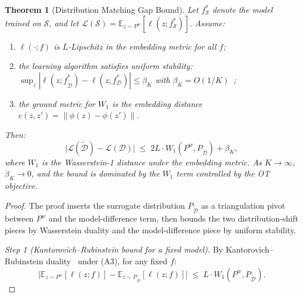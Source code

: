 \documentclass[12pt, a4paper, twoside]{book}
\numberwithin{equation}{chapter}
\theoremstyle{plain}
\newtheorem{theorem}{Theorem}[chapter]
\theoremstyle{definition}
\theoremstyle{remark}
\newenvironment{foldable}{}{}
\begin{document}
\begin{foldable}
  \begin{theorem}[Distribution Matching Gap Bound] \label{thm:gap}
    Let $f^*_{\mathcal{S}}$ denote the model trained on $\mathcal{S}$, and let $\mathcal{L}(\mathcal{S}) = \mathbb{E}_{z \sim P^w}[\ell(z; f^*_{\mathcal{S}})]$.
    Assume:
    \begin{enumerate}[label=\textbf{(A\arabic*)},leftmargin=*]
      \item $\ell(\cdot; f)$ is $L$-Lipschitz in the embedding metric for all $f$;
      \item the learning algorithm satisfies uniform stability: $\sup_z |\ell(z; f^*_{\tilde{\mathcal{D}}}) - \ell(z; f^*_\mathcal{D})| \leq \beta_K$ with $\beta_K = O(1/K)$~\cite{bousquet2002stability};
      \item the ground metric for $W_1$ is the embedding distance $c(z, z') = \|\phi(z) - \phi(z')\|$.
    \end{enumerate}
    Then:
    \begin{equation}
      \bigl|\mathcal{L}(\tilde{\mathcal{D}}) - \mathcal{L}(\mathcal{D})\bigr|
      \;\leq\; 2L \cdot W_1(P^w, P_{\tilde{\mathcal{D}}}) + \beta_K,
      \label{eq:gap-bound}
    \end{equation}
    where $W_1$ is the Wasserstein-1 distance under the embedding metric.
    As $K \to \infty$, $\beta_K \to 0$, and the bound is dominated by the $W_1$ term controlled by the \ac{OT} objective.
  \end{theorem}
  \begin{proof}
    The proof inserts the surrogate distribution $P_{\tilde{\mathcal{D}}}$ as a triangulation pivot between $P^w$ and the model-difference term, then bounds the two distribution-shift pieces by Wasserstein duality and the model-difference piece by uniform stability.

    \textit{Step 1 (Kantorovich--Rubinstein bound for a fixed model).}
    By Kantorovich--Rubinstein duality~\cite{villani2008optimal} under (A3), for any fixed $f$:
    \begin{equation*}
      \bigl|\mathbb{E}_{z \sim P^w}[\ell(z; f)] - \mathbb{E}_{z \sim P_{\tilde{\mathcal{D}}}}[\ell(z; f)]\bigr|
      \;\leq\; L \cdot W_1(P^w, P_{\tilde{\mathcal{D}}}).
    \end{equation*}


\end{proof}
\end{foldable}
\end{document}
